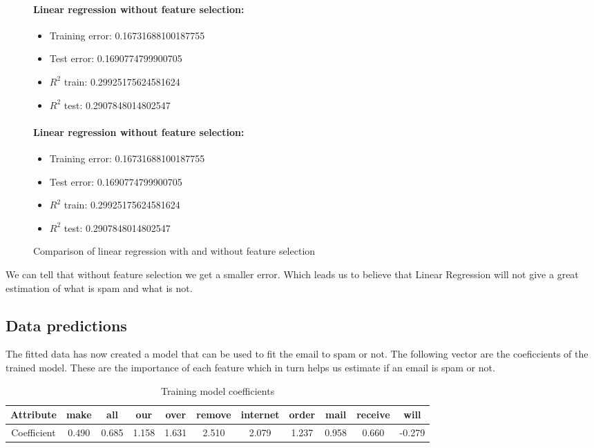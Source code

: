 \documentclass[11pt, paper=a4]{article}
\begin{document}
\begin{figure}[h]
  \begin{minipage}{0.5\textwidth}
    \paragraph{Linear regression without feature selection:}
    \begin{itemize}
    \item Training error: 0.16731688100187755
    \item Test error:     0.1690774799900705
    \item $R^2$ train:     0.29925175624581624
    \item $R^2$ test:     0.2907848014802547
    \end{itemize}
  \end{minipage} \hfill
  \begin{minipage}{0.5\textwidth}
    \paragraph{Linear regression without feature selection:}
    \begin{itemize}
    \item Training error: 0.16731688100187755
    \item Test error:     0.1690774799900705
    \item $R^2$ train:     0.29925175624581624
    \item $R^2$ test:     0.2907848014802547
    \end{itemize}
  \end{minipage} \vfill
  \caption{Comparison of linear regression with and without feature selection}
\end{figure}

We can tell that without feature selection we get a smaller
error. Which leads us to believe that Linear Regression will not give
a great estimation of what is spam and what is not.

\subsection{Data predictions}
The fitted data has now created a model that can be used to fit the
email to spam or not.  The following vector are the coeficcients of
the trained model. These are the importance of each feature which in
turn helps us estimate if an email is spam or not.

\begin{table}[h]
  \centering
  \begin{tabular}{c|c|c|c|c|c|c|c|c|c|c}
    \hline Attribute & make & all & our & over & remove & internet & order
    & mail & receive & will \\ \hline Coefficient & 0.490 & 0.685 & 1.158
                                        & 1.631 & 2.510 & 2.079 & 1.237 & 0.958 & 0.660 & -0.279 \\ \hline
  \end{tabular}
  \caption{Training model coefficients}
\end{table}
\end{document}
